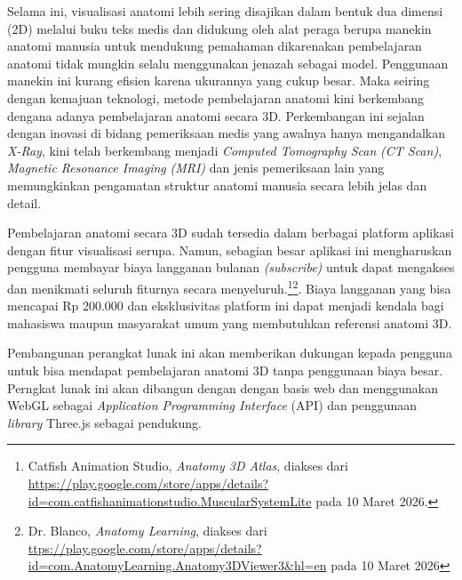 \documentclass[a4paper,twoside]{article}
\begin{document}
         Selama ini, visualisasi anatomi lebih sering disajikan dalam bentuk dua dimensi (2D) melalui buku teks medis dan didukung oleh alat peraga berupa manekin anatomi manusia untuk mendukung pemahaman dikarenakan pembelajaran anatomi tidak mungkin selalu menggunakan jenazah sebagai model. Penggunaan manekin ini kurang efisien karena ukurannya yang cukup besar. Maka seiring dengan kemajuan teknologi, metode pembelajaran anatomi kini berkembang dengana adanya pembelajaran anatomi secara 3D. Perkembangan ini sejalan dengan inovasi di bidang pemeriksaan medis yang awalnya hanya mengandalkan \textit{X-Ray}, kini telah berkembang menjadi \textit{Computed Tomography Scan} \textit{(CT Scan)}, \textit{Magnetic Resonance Imaging} \textit{(MRI)} dan jenis pemeriksaan lain yang memungkinkan pengamatan struktur anatomi manusia secara lebih jelas dan detail.
         

         Pembelajaran anatomi secara 3D sudah tersedia dalam berbagai platform aplikasi dengan fitur visualisasi serupa. Namun, sebagian besar aplikasi ini mengharuskan pengguna membayar biaya langganan bulanan \textit{(subscribe)} untuk dapat mengakses dan menikmati seluruh fiturnya secara menyeluruh.\footnote{Catfish Animation Studio, \textit{Anatomy 3D Atlas}, diakses dari \url{https://play.google.com/store/apps/details?id=com.catfishanimationstudio.MuscularSystemLite} pada 10 Maret 2026.}\footnote{Dr. Blanco, \textit{Anatomy Learning}, diakses dari \url {ttps://play.google.com/store/apps/details?id=com.AnatomyLearning.Anatomy3DViewer3&hl=en} pada 10 Maret 2026}. Biaya langganan yang bisa mencapai Rp 200.000 dan eksklusivitas platform ini dapat menjadi kendala bagi mahasiswa maupun masyarakat umum yang membutuhkan referensi anatomi 3D. 


        Pembangunan perangkat lunak ini akan memberikan dukungan kepada pengguna untuk bisa mendapat pembelajaran anatomi 3D tanpa penggunaan biaya besar. Perngkat lunak ini akan dibangun dengan dengan basis web dan  menggunakan WebGL sebagai \textit{Application Programming Interface} (API) dan penggunaan \textit{library} Three.js sebagai pendukung. 
        
\end{document}

